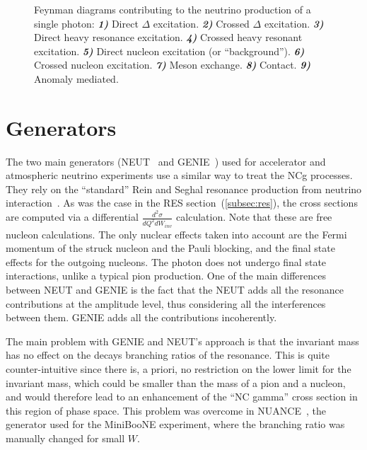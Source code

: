 \begin{figure}[ht]
  \caption[Feynman diagrams contributing to the neutrino production of
    a single photon]{Feynman diagrams contributing to the neutrino production of
    a single photon:
    \textbf{\textit{1)}} Direct $\Delta$ excitation.
    \textbf{\textit{2)}} Crossed $\Delta$ excitation.
    \textbf{\textit{3)}} Direct heavy resonance excitation.
    \textbf{\textit{4)}} Crossed heavy resonant excitation.
    \textbf{\textit{5)}} Direct nucleon excitation (or
    ``background'').
    \textbf{\textit{6)}} Crossed nucleon excitation.
    \textbf{\textit{7)}} Meson exchange.
    \textbf{\textit{8)}} Contact.
    \textbf{\textit{9)}} Anomaly mediated.}
  \label{fig:FeynmanDiagramNCG}
\end{figure} 

\clearpage

\section{Generators}
\label{sec:generator}
The two main generators (\Gls{NEUT}~\cite{NEUT} and
\Gls{GENIE}~\cite{GENIE1,GENIE2}) used for accelerator and atmospheric
neutrino experiments use a similar way to treat the \Gls{NCg}
processes. They rely on the ``standard'' Rein and Seghal resonance
production from neutrino interaction~\cite{Rein1}. As was the case in
the \Gls{RES} section~(\ref{subsec:res}), the cross sections are
computed via a differential $\frac{d^2\sigma}{dQ^2dW_{inv}}$
calculation. Note that these are free nucleon calculations. The only
nuclear effects taken into account are the Fermi momentum of the
struck nucleon and the Pauli blocking, and the final state effects for
the outgoing nucleons. The photon does not undergo final state
interactions, unlike a typical pion production. One of the main
differences between \Gls{NEUT} and \Gls{GENIE} is the fact that the
\Gls{NEUT} adds all the resonance contributions at the amplitude
level, thus considering all the interferences between
them. \Gls{GENIE} adds all the contributions incoherently.

The main problem with \Gls{GENIE} and \Gls{NEUT}'s approach is that
the invariant mass has no effect on the decays branching ratios of the
resonance. This is quite counter-intuitive since there is, a priori,
no restriction on the lower limit for the invariant mass, which could
be smaller than the mass of a pion and a nucleon, and would therefore
lead to an enhancement of the ``NC gamma'' cross section in this
region of phase space. This problem was overcome in
\Gls{NUANCE}~\cite{nuance}, the generator used for the \Gls{MiniBooNE}
experiment, where the branching ratio was manually changed for small
$W$.

